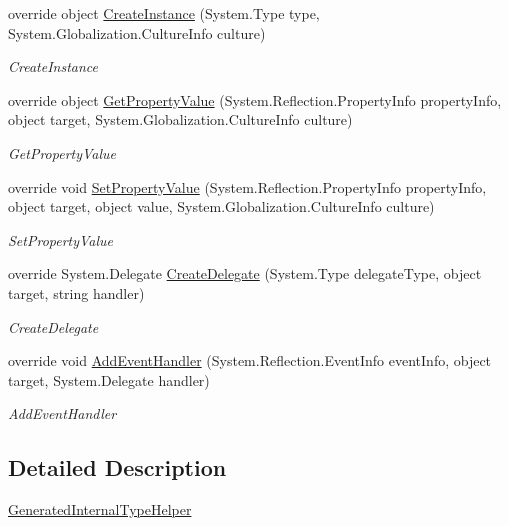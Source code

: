 \begin{DoxyCompactItemize}
override object \hyperlink{class_xaml_generated_namespace_1_1_generated_internal_type_helper_aefb7a98fceb9c287cef4756942f441d1}{Create\-Instance} (System.\-Type type, System.\-Globalization.\-Culture\-Info culture)
\begin{DoxyCompactList}\small\item\em Create\-Instance \end{DoxyCompactList}\item 
override object \hyperlink{class_xaml_generated_namespace_1_1_generated_internal_type_helper_afdc9fe15b56607d02082908d934480c6}{Get\-Property\-Value} (System.\-Reflection.\-Property\-Info property\-Info, object target, System.\-Globalization.\-Culture\-Info culture)
\begin{DoxyCompactList}\small\item\em Get\-Property\-Value \end{DoxyCompactList}\item 
override void \hyperlink{class_xaml_generated_namespace_1_1_generated_internal_type_helper_ade0f04c0f7b18dd5b170e071d5534d38}{Set\-Property\-Value} (System.\-Reflection.\-Property\-Info property\-Info, object target, object value, System.\-Globalization.\-Culture\-Info culture)
\begin{DoxyCompactList}\small\item\em Set\-Property\-Value \end{DoxyCompactList}\item 
override System.\-Delegate \hyperlink{class_xaml_generated_namespace_1_1_generated_internal_type_helper_a8ec4c37e82d9f4e867e9655f4eac3a78}{Create\-Delegate} (System.\-Type delegate\-Type, object target, string handler)
\begin{DoxyCompactList}\small\item\em Create\-Delegate \end{DoxyCompactList}\item 
override void \hyperlink{class_xaml_generated_namespace_1_1_generated_internal_type_helper_a73471f4a6d1ca4c4fceec9ad8610f0c8}{Add\-Event\-Handler} (System.\-Reflection.\-Event\-Info event\-Info, object target, System.\-Delegate handler)
\begin{DoxyCompactList}\small\item\em Add\-Event\-Handler \end{DoxyCompactList}\end{DoxyCompactItemize}


\subsection{Detailed Description}
\hyperlink{class_xaml_generated_namespace_1_1_generated_internal_type_helper}{Generated\-Internal\-Type\-Helper} 



